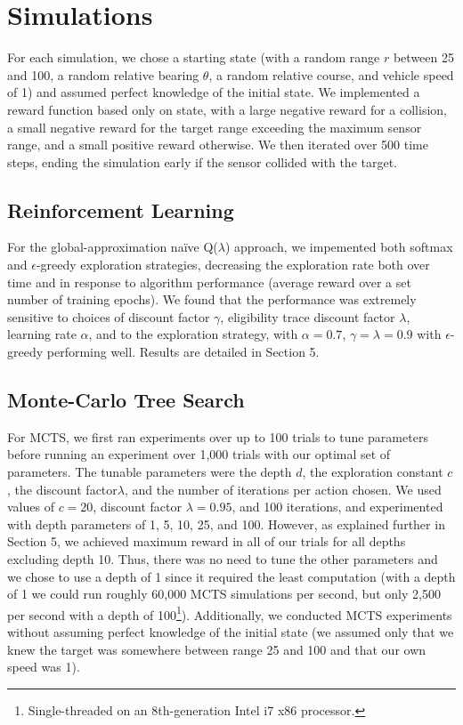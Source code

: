\documentclass{article}
\begin{document}
\section{Simulations}

\par For each simulation, we chose a starting state (with a random range $r$ between 25 and 100, a random relative bearing $\theta$, a random relative course, and vehicle speed of 1) and assumed perfect knowledge of the initial state. We implemented a reward function based only on state, with a large negative reward for a collision, a small negative reward for the target range exceeding the maximum sensor range, and a small positive reward otherwise. We then iterated over 500 time steps, ending the simulation early if the sensor collided with the target.

\subsection{Reinforcement Learning}
\par For the global-approximation naïve Q($\lambda$) approach, we impemented both softmax and $\epsilon$-greedy exploration strategies, decreasing the exploration rate both over time and in response to algorithm performance (average reward over a set number of training epochs). We found that the performance was extremely sensitive to choices of discount factor $\gamma$, eligibility trace discount factor $\lambda$, learning rate $\alpha$, and to the exploration strategy, with $\alpha = 0.7$, $\gamma = \lambda = 0.9$ with $\epsilon$-greedy performing well. Results are detailed in Section 5.

\subsection{Monte-Carlo Tree Search}
\par For MCTS, we first ran experiments over up to 100 trials to tune parameters before running an experiment over 1,000 trials with our optimal set of parameters. The tunable parameters were the depth $d$, the exploration constant $c$, the discount factor$\lambda$, and the number of iterations per action chosen. We used values of $c = 20$, discount factor $\lambda = 0.95$, and 100 iterations, and experimented with depth parameters of 1, 5, 10, 25, and 100. However, as explained further in Section 5, we achieved maximum reward in all of our trials for all depths excluding depth 10. Thus, there was no need to tune the other parameters and we chose to use a depth of 1 since it required the least computation (with a depth of 1 we could run roughly 60,000 MCTS simulations per second, but only 2,500 per second with a depth of 100\footnote{Single-threaded on an 8th-generation Intel i7 x86 processor.}). Additionally, we conducted MCTS experiments without assuming perfect knowledge of the initial state (we assumed only that we knew the target was somewhere between range 25 and 100 and that our own speed was 1).
\end{document}

